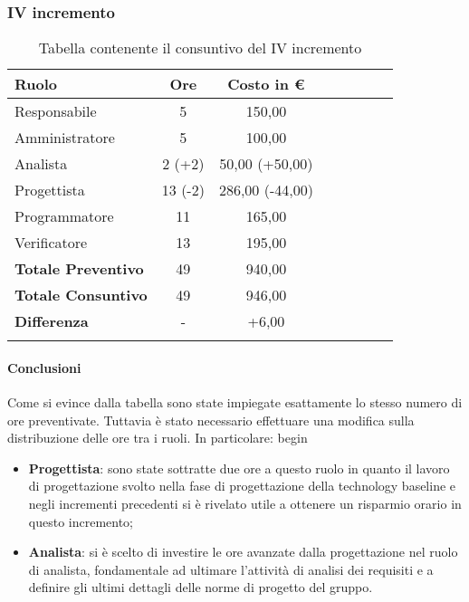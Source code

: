 \subsubsection{IV incremento}\label{_consuntivoImp1}
\begin{longtable}{|l|c|c|c|c|c|c|c|}
	\hline
	\rowcolor{lighter-grayer}
	\textbf{Ruolo}             & \textbf{Ore} & \textbf{Costo in €} \\
	\hline
	\endfirsthead

	\hline
	Responsabile               & 5           & 150,00 \\
	\hline
	\hline
	Amministratore             & 5       & 100,00      \\
	\hline
	\hline
	Analista                   & 2 (+2)       & 50,00 (+50,00)   \\
	\hline
	\hline
	Progettista                & 13 (-2)            & 286,00 (-44,00)              \\
	\hline
	\hline
	Programmatore              & 11            & 165,00                   \\
	\hline
	\hline
	Verificatore               & 13       & 195,00    \\
	\hline
	\textbf{Totale Preventivo} & 49          & 940,00           \\
	\hline
	\hline
	\textbf{Totale Consuntivo} & 49          & 946,00            \\
	\hline
	\hline
	\textbf{Differenza}        & -           & +6,00           \\
	\hline
	\rowcolor{white}
	\caption{Tabella contenente il consuntivo del IV incremento}
\end{longtable}
\paragraph{Conclusioni}
Come si evince dalla tabella sono state impiegate esattamente lo stesso numero di ore preventivate. Tuttavia è stato necessario effettuare una modifica sulla distribuzione delle ore tra i ruoli. In particolare:
begin\begin{itemize}
	\item \textbf{Progettista}: sono state sottratte due ore a questo ruolo in quanto il lavoro di progettazione svolto nella fase di progettazione della technology baseline e negli incrementi precedenti si è rivelato utile a ottenere un risparmio orario in questo incremento;
	\item \textbf{Analista}: si è scelto di investire le ore avanzate dalla progettazione nel ruolo di analista, fondamentale ad ultimare l'attività di analisi dei requisiti e a definire gli ultimi dettagli delle norme di progetto del gruppo.
\end{itemize} 

